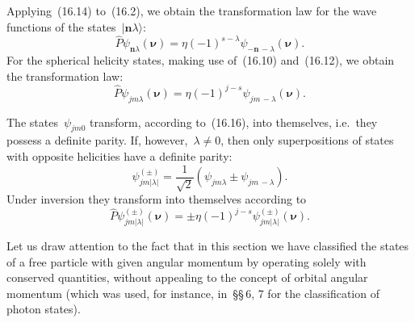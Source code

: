Applying~(16.14) to~(16.2), we obtain the transformation law for the wave functions of the states~$|\mathbf{n}\lambda\rangle$:
\begin{equation}
\hat{P}\psi_{\mathbf{n}\lambda}(\boldsymbol{\nu}) = \eta(-1)^{s-\lambda}\psi_{-\mathbf{n}\,-\lambda}(\boldsymbol{\nu}).
\tag{16.15}
\end{equation}
For the spherical helicity states, making use of~(16.10) and~(16.12), we obtain the transformation law:
\begin{equation}
\hat{P}\psi_{jm\lambda}(\boldsymbol{\nu}) = \eta(-1)^{j-s}\psi_{jm\,-\lambda}(\boldsymbol{\nu}).
\tag{16.16}
\end{equation}

The states~$\psi_{jm0}$ transform, according to~(16.16), into themselves, i.e.\ they possess a definite parity. If, however,~$\lambda \neq 0$, then only superpositions of states with opposite helicities have a definite parity:
\begin{equation}
\psi^{(\pm)}_{jm|\lambda|} = \frac{1}{\sqrt{2}}\left(\psi_{jm\lambda} \pm \psi_{jm\,-\lambda}\right).
\tag{16.17}
\end{equation}
Under inversion they transform into themselves according to
\begin{equation}
\hat{P}\psi^{(\pm)}_{jm|\lambda|}(\boldsymbol{\nu}) = \pm\eta(-1)^{j-s}\psi^{(\pm)}_{jm|\lambda|}(\boldsymbol{\nu}).
\tag{16.18}
\end{equation}

Let us draw attention to the fact that in this section we have classified the states of a free particle with given angular momentum by operating solely with conserved quantities, without appealing to the concept of orbital angular momentum (which was used, for instance, in~\S\S\,6, 7 for the classification of photon states).

